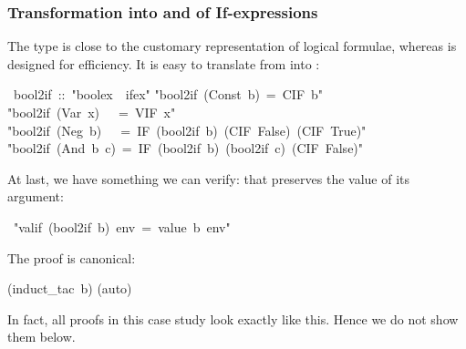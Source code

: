 \begin{isabelle}
\begin{isamarkuptext}
\subsubsection{Transformation into and of If-expressions}

The type  is close to the customary representation of logical
formulae, whereas  is designed for efficiency. It is easy to
translate from  into :%
\end{isamarkuptext}%
~bool2if~::~{"}boolex~{\isasymRightarrow}~ifex{"}\isanewline
{}\isanewline
{"}bool2if~(Const~b)~=~CIF~b{"}\isanewline
{"}bool2if~(Var~x)~~~=~VIF~x{"}\isanewline
{"}bool2if~(Neg~b)~~~=~IF~(bool2if~b)~(CIF~False)~(CIF~True){"}\isanewline
{"}bool2if~(And~b~c)~=~IF~(bool2if~b)~(bool2if~c)~(CIF~False){"}%
\begin{isamarkuptext}%
\noindent
At last, we have something we can verify: that  preserves the
value of its argument:%
\end{isamarkuptext}%
~{"}valif~(bool2if~b)~env~=~value~b~env{"}%
\begin{isamarkuptxt}%
\noindent
The proof is canonical:%
\end{isamarkuptxt}%
(induct\_tac~b)\isanewline
{}(auto)%
\begin{isamarkuptext}%
\noindent
In fact, all proofs in this case study look exactly like this. Hence we do
not show them below.


\end{isamarkuptext}
\end{isabelle}
